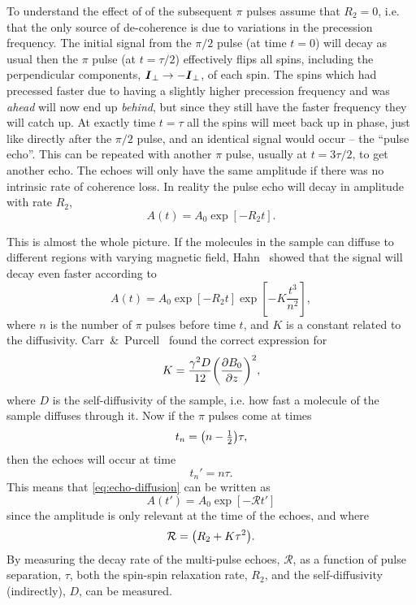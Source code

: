 \documentclass[11pt,a4paper, twocolumn,
swedish, english %
]{article}
\begin{document}
To understand the effect of of the subsequent $\pi$ pulses assume that
$R_2=0$, i.e. that the only source of de-coherence is due to
variations in the precession frequency. The initial signal from the
$\pi/2$ pulse (at time $t=0$) will decay as usual then the $\pi$ pulse
(at $t=\tau/2$) effectively flips all spins, including the
perpendicular components, $\vb*I_\perp\to-\vb*I_\perp$, of each
spin. The spins which had precessed faster due to having a slightly
higher precession frequency and was \emph{ahead} will now end up
\emph{behind}, but since they still have the faster frequency they
will catch up. At exactly time $t=\tau$ all the spins will meet
back up in phase, just like directly after the $\pi/2$ pulse, and an
identical signal would occur -- the ``pulse echo''. This can be
repeated with another $\pi$ pulse, usually at $t=3\tau/2$, to get
another echo. The echoes will only have the same amplitude if there
was no intrinsic rate of coherence loss. In reality the pulse echo
will decay in amplitude with rate $R_2$,
\begin{equation}
A(t)=A_0\exp[-R_2t].
\end{equation}

This is almost the whole picture. If the molecules in the sample can
diffuse to different regions with varying magnetic field,
Hahn~\cite{Hahn1950} showed that the signal will decay even faster
according to
\begin{equation}\label{eq:echo-diffusion}
A(t)=A_0\exp[-R_2t]
\exp[-K\frac{t^3}{n^2}],
\end{equation}
where $n$ is the number of $\pi$ pulses before time $t$, and $K$ is a
constant related to the diffusivity. Carr~\&~Purcell~\cite{Carr-Purcell1954} found the correct expression for
\begin{equation}
K=\frac{\gamma^2D}{12}\qty(\pdv{B_0}{z})^2,
\end{equation}
where $D$ is the self-diffusivity of the sample, i.e. how fast a
molecule of the sample diffuses through it. Now if the $\pi$ pulses
come at times
\begin{equation}
t_{n}=\qty(n-\tfrac{1}{2})\tau,
\end{equation}
then the echoes will occur at
time 
\begin{equation}
t_n'=n\tau.
\end{equation}
This means that \eqref{eq:echo-diffusion} can be written as
\begin{equation}
A(t')=A_0\exp[-\mathcal{R}t']
\end{equation}
since the amplitude is only relevant at the time of the echoes, and
where 
\begin{equation}
\mathcal{R}=\qty(R_2+K\tau^2).
\end{equation}
By measuring the decay rate of the multi-pulse echoes, $\mathcal{R}$,
as a function of pulse separation, $\tau$, both the spin-spin relaxation
rate, $R_2$, and the self-diffusivity (indirectly), $D$, can be measured.
\end{document}
